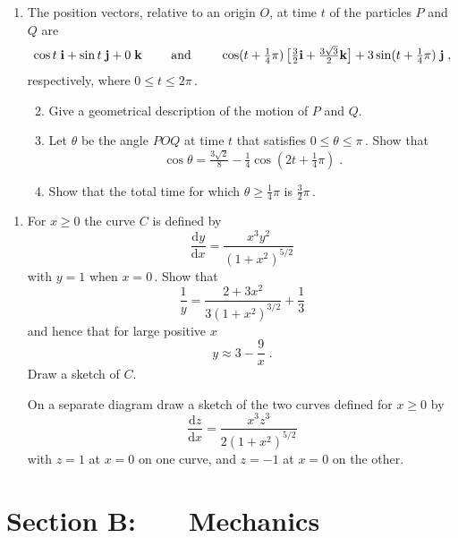 \documentclass[a4, 11pt]{report}
\newlength{\qspace}
\newcounter{qnumber}
\newenvironment{question}%
 {\vspace{\qspace}
  \begin{enumerate}[\bfseries 1\quad][10]%
    \setcounter{enumi}{\value{qnumber}}%
    \item%
 }
{
  \end{enumerate}
  \filbreak
  \stepcounter{qnumber}
 }
\newenvironment{questionparts}[1][1]%
 {
  \begin{enumerate}[\bfseries (i)]%
    \setcounter{enumii}{#1}
    \addtocounter{enumii}{-1}
    \setlength{\itemsep}{5mm}
    \setlength{\parskip}{8pt}
 }
 {
  \end{enumerate}
 }
\def\d{{\mathrm d}}
\def\le{\leqslant}
\def\ge{\geqslant}
\begin{document}
\begin{question}
The position vectors, relative to an origin $O$,
at time $t$  of the particles $P$ and $Q$ are
$$\cos t \; {\bf i} + \sin t\;{\bf j} + 0 \; {\bf k}
\hbox{ \ \ \ \ \ \ and \ \ \ \ \ \ }
 \cos (t+\tfrac14{\pi})\, \big[{\tfrac32}{\bf i} + 
{ \tfrac  {3\sqrt{3}}2} {\bf k}\big]
+
3\sin(t+\tfrac14{\pi}) \; {\bf j}\;,$$ 
respectively, where $0\le t \le 2\pi\,$.


\begin{questionparts}
\item
Give a geometrical description of the motion of $P$ and $Q$.

\item
Let $\theta$ be the angle $POQ$ at time $t$ that satisfies 
$0\le\theta\le\pi\,$. Show that
\[
\cos\theta = \tfrac{3\surd2}{8} -\tfrac14 \cos( 2t +\tfrac14 \pi)\;.
\]


\item  Show that 
the total time  for which 
$\theta \ge \frac14 \pi$ is $\tfrac32 \pi\,$.

\end{questionparts}
\end{question}
		
\begin{question}	
For $x \ge 0$ the curve $C$ is defined by 
$$
{\frac{\d y} {\d x}} = \frac{x^3y^2}{(1 + x^2)^{5/2}}
$$
with $y = 1$ when $x=0\,$. Show that  
\[
\frac 1 y = \frac {2+3x^2}{3(1+x^2)^{3/2}} +\frac13
\]
and hence 
that for large positive $x$ 
$$
y \approx 3 - \frac 9 x\;.
$$ 
Draw a sketch of $C$.

On a separate diagram draw a sketch of the two curves 
defined for $x \ge 0$ by
$$
\frac {\d z} {\d x} = \frac{x^3z^3}{2(1 + x^2)^{5/2}}
$$
with $z = 1$ at $x=0$ on one curve, and
$z = -1$ at $x=0$ on the other. 
\end{question}	
		

		
	
\newpage
\section*{Section B: \ \ \ Mechanics}
\end{document}
